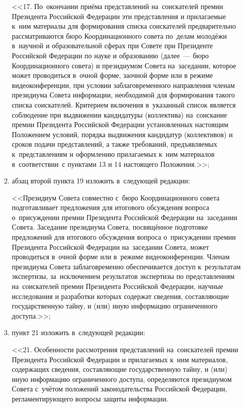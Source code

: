 \documentclass[14pt, a4paper]{extarticle}
\begin{document}
\begin{enumerate}
\begin{enumerate}[label=\asbuk*), ref=\asbuk*]
		\sloppy<<17. По~окончании приёма представлений на~соискателей премии Президента Российской Федерации эти представления и прилагаемые к~ним материалы для формирования списка соискателей предварительно рассматриваются бюро Координационного совета по~делам молодёжи в~научной и образовательной сферах при Совете при Президенте Российской Федерации по науке и образованию (далее~--- бюро Координационного совета) и президиумом Совета на~заседании, которое может проводиться в~очной форме, заочной форме или в режиме видеоконференции, при условии заблаговременного направления членам президиума Совета информации, необходимой для формирования такого списка соискателей. Критерием включения в~указанный список является соблюдение при выдвижении кандидатуры (коллектива) на~соискание премии Президента Российской Федерации установленных настоящим Положением условий, порядка выдвижения кандидатур (коллективов) и сроков подачи представлений, а также требований, предъявляемых к~представлениям и оформлению прилагаемых к~ним материалов в~соответствии~с пунктами 13 и 14 настоящего Положения.>>;
		
		\item абзац второй пункта 19 изложить в~следующей редакции:
		
		<<Президиум Совета совместно с~бюро Координационного совета подготавливает предложения для итогового обсуждения вопроса о~присуждении премии Президента Российской Федерации на~заседании Совета. Заседание президиума Совета, посвящённое подготовке предложений для итогового обсуждения вопроса о~присуждении премии Президента Российской Федерации на~заседании Совета, может проводиться в~очной форме или в~режиме видеоконференции. Членам президиума Совета заблаговременно обеспечивается доступ к~результатам экспертизы, за~исключением результатов экспертизы по представлениям на~соискателей премии Президента Российской Федерации, научные исследования и разработки которых содержат сведения, составляющие государственную тайну, и (или) иную информацию ограниченного доступа.>>;
		
		\item пункт 21 изложить в~следующей редакции:
		
		<<21. Особенности рассмотрения представлений на~соискателей премии Президента Российской Федерации и прилагаемых к~ним материалов, содержащих сведения, составляющие государственную тайну, и (или) иную информацию ограниченного доступа, определяются президиумом Совета с~учётом положений законодательства Российской Федерации, регламентирующего вопросы защиты информации.
		

\end{enumerate}
\end{enumerate}
\end{document}
